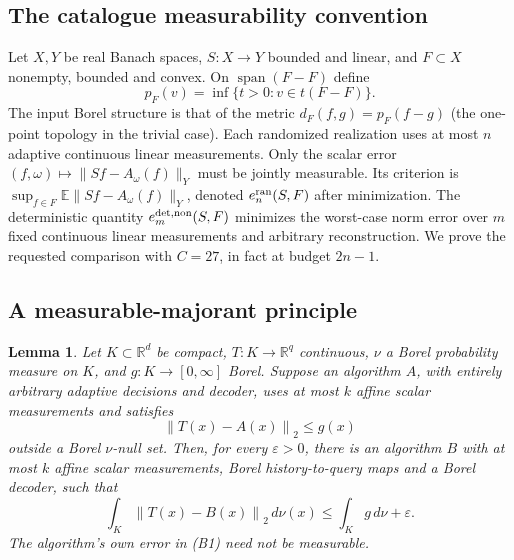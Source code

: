 \documentclass[11pt,a4paper]{article}
\newcommand{\R}{\mathbb R}
\newcommand{\norm}[1]{\left\lVert#1\right\rVert}
\newtheorem{lemma}[theorem]{Lemma}
\theoremstyle{definition}
\theoremstyle{remark}
\numberwithin{equation}{section}
\begin{document}
\subsection{The catalogue measurability convention}
Let $X,Y$ be real Banach spaces, $S:X\to Y$ bounded and linear, and $F\subset X$ nonempty, bounded and convex. On $\operatorname{span}(F-F)$ define
\[
p_F(v)=\inf\{t>0:v\in t(F-F)\}.
\]
The input Borel structure is that of the metric $d_F(f,g)=p_F(f-g)$ (the one-point topology in the trivial case). Each randomized realization uses at most $n$ adaptive continuous linear measurements. Only the scalar error $(f,\omega)\mapsto\|Sf-A_\omega(f)\|_Y$ must be jointly measurable. Its criterion is $\sup_{f\in F}\mathbb E\|Sf-A_\omega(f)\|_Y$, denoted $e_n^{\rm ran}(S,F)$ after minimization. The deterministic quantity $e_m^{\rm det,non}(S,F)$ minimizes the worst-case norm error over $m$ fixed continuous linear measurements and arbitrary reconstruction. We prove the requested comparison with $C=27$, in fact at budget $2n-1$.

\subsection{A measurable-majorant principle}

\begin{lemma}
\label{lem:majorant}
Let \(K\subset\R^d\) be compact, \(T:K\to\R^q\) continuous,
\(\nu\) a Borel probability measure on \(K\), and
\(g:K\to[0,\infty]\) Borel. Suppose an algorithm \(A\), with entirely
arbitrary adaptive decisions and decoder, uses at most \(k\) affine
scalar measurements and satisfies
\[
                       \norm{T(x)-A(x)}_2\le g(x)
 \tag{B1}
\]
outside a Borel \(\nu\)-null set. Then, for every \(\varepsilon>0\),
there is an algorithm \(B\) with at most \(k\) affine scalar
measurements, Borel history-to-query maps and a Borel decoder, such
that
\[
       \int_K\norm{T(x)-B(x)}_2\,d\nu(x)
                    \le \int_K g\,d\nu+\varepsilon .
 \tag{B2}
\]
The algorithm's own error in (B1) need not be measurable.
\end{lemma}
\end{document}
